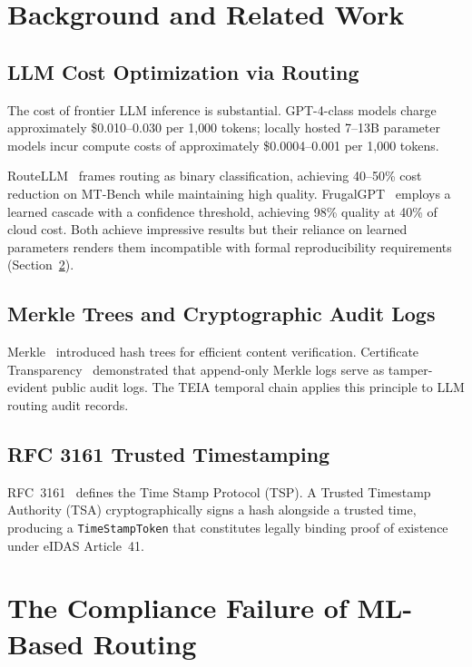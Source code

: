 \documentclass[11pt,a4paper]{article}
\newcommand{\teia}{\textsc{TEIA}}
\begin{document}
\section{Background and Related Work}

\subsection{LLM Cost Optimization via Routing}

The cost of frontier LLM inference is substantial. GPT-4-class models charge
approximately \$0.010--0.030 per 1{,}000 tokens; locally hosted 7--13B parameter
models incur compute costs of approximately \$0.0004--0.001 per 1{,}000 tokens.

RouteLLM~\cite{routellm} frames routing as binary classification, achieving
40--50\% cost reduction on MT-Bench while maintaining high quality.
FrugalGPT~\cite{frugalgpt} employs a learned cascade with a confidence threshold,
achieving 98\% quality at 40\% of cloud cost. Both achieve impressive results but
their reliance on learned parameters renders them incompatible with formal
reproducibility requirements (Section~\ref{sec:failure}).

\subsection{Merkle Trees and Cryptographic Audit Logs}

Merkle~\cite{merkle} introduced hash trees for efficient content verification.
Certificate Transparency~\cite{rfc6962} demonstrated that append-only Merkle logs
serve as tamper-evident public audit logs. The \teia{} temporal chain applies this
principle to LLM routing audit records.

\subsection{RFC 3161 Trusted Timestamping}

RFC~3161~\cite{rfc3161} defines the Time Stamp Protocol (TSP). A Trusted Timestamp
Authority (TSA) cryptographically signs a hash alongside a trusted time, producing
a \texttt{TimeStampToken} that constitutes legally binding proof of existence under
eIDAS Article~41.

\section{The Compliance Failure of ML-Based Routing}
\label{sec:failure}
\end{document}
